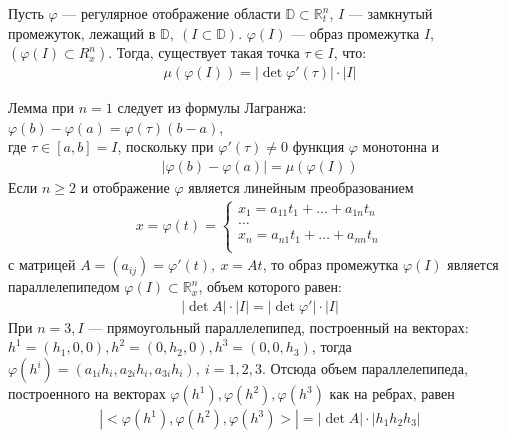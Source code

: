 \begin{lemma}
  Пусть $\varphi$ --- регулярное отображение области $\mathbb{D} \subset
  \mathbb{R}_t^n$, $I$ --- замкнутый промежуток, лежащий в $\mathbb{D}, \ (I
  \subset \mathbb{D})$. $\varphi(I)$ --- образ промежутка $I$, $(\varphi(I)
  \subset R_x^n)$. Тогда, существует такая точка $\tau \in I$, что:
  \begin{gather*}
    \mu(\varphi(I)) = |\det \varphi'(\tau)| \cdot |I|
  \end{gather*}
  \begin{comment}
    $|I| = \mu(I)$
  \end{comment}
\end{lemma}

\begin{clarification}
  Лемма при $n = 1$ следует из формулы Лагранжа:
  $\varphi(b) - \varphi(a) = \varphi(\tau)(b-a)$, \\ где $\tau \in [a,b] = I$,
  поскольку при $\varphi'(\tau) \not = 0$ функция $\varphi$ монотонна и
  \begin{gather*}
    |\varphi(b) - \varphi(a)| = \mu(\varphi(I))
  \end{gather*}
  Если $n \geq 2$ и отображение $\varphi$ является линейным преобразованием
  \begin{gather*}
    x = \varphi(t) =
    \begin{cases}
      x_1 = a_{11}t_1 + \dots + a_{1n} t_n \\
      \dots \\
      x_n = a_{n1}t_1 + \dots + a_{nn} t_n \\
    \end{cases}
  \end{gather*}
  с матрицей $A = (a_{ij}) = \varphi'(t), \ x = At$, то образ промежутка
  $\varphi(I)$ является параллелепипедом $\varphi(I) \subset \mathbb{R}_x^n$,
  объем которого равен:
  \begin{gather*}
    |\det A| \cdot |I| = |\det \varphi'| \cdot |I|
  \end{gather*}
  При $n = 3, I$ --- прямоугольный параллелепипед, построенный на векторах:
  $h^1 = (h_1, 0, 0), h^2 = (0, h_2, 0), h^3 = (0, 0, h_3)$, тогда
  $\varphi(h^i) = (a_{1i} h_i, a_{2i} h_i, a_{3i} h_i), \ i = 1, 2, 3$. Отсюда
  объем параллелепипеда, построенного на векторах $\varphi(h^1), \varphi(h^2),
  \varphi(h^3)$ как на ребрах, равен
  \begin{gather*}
    |<\varphi(h^1), \varphi(h^2), \varphi(h^3)>| = |\det A| \cdot |h_1 h_2 h_3|
  \end{gather*}

\end{clarification}
